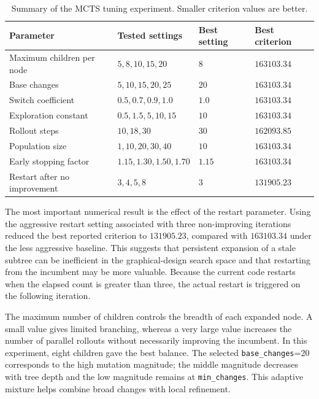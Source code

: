 \documentclass[twoside]{article}
\begin{document}
\begin{table}[ht]
\begin{center}
\footnotesize
\caption{Summary of the MCTS tuning experiment. Smaller criterion values are
better.}\label{tab:tuning}
\begin{tabular}{|p{3.2cm}|p{4.7cm}|p{2.0cm}|p{2.4cm}|}
\hline
Parameter & Tested settings & Best setting & Best criterion \\ \hline \hline
Maximum children per node & $5,8,10,15,20$ & $8$ & $163103.34$ \\ \hline
Base changes & $5,10,15,20,25$ & $20$ & $163103.34$ \\ \hline
Switch coefficient & $0.5,0.7,0.9,1.0$ & $1.0$ & $163103.34$ \\ \hline
Exploration constant & $0.5,1.5,5,10,15$ & $10$ & $163103.34$ \\ \hline
Rollout steps & $10,18,30$ & $30$ & $162093.85$ \\ \hline
Population size & $1,10,20,30,40$ & $10$ & $163103.34$ \\ \hline
Early stopping factor & $1.15,1.30,1.50,1.70$ & $1.15$ & $163103.34$ \\ \hline
Restart after no improvement & $3,4,5,8$ & $3$ & $131905.23$ \\ \hline
\end{tabular}
\end{center}
\end{table}

The most important numerical result is the effect of the restart parameter.
Using the aggressive restart setting associated with three non-improving
iterations reduced the best reported criterion to $131905.23$, compared with
$163103.34$ under the less aggressive baseline. This suggests that persistent
expansion of a stale subtree can be inefficient in the graphical-design search
space and that restarting from the incumbent may be more valuable. Because the
current code restarts when the elapsed count is greater than three, the actual
restart is triggered on the following iteration.

The maximum number of children controls the breadth of each expanded node. A
small value gives limited branching, whereas a very large value increases the
number of parallel rollouts without necessarily improving the incumbent. In
this experiment, eight children gave the best balance. The selected
{\tt base\_changes}=20 corresponds to the high mutation magnitude; the middle
magnitude decreases with tree depth and the low magnitude remains at
{\tt min\_changes}. This adaptive mixture helps combine broad changes with local
refinement.
\end{document}

